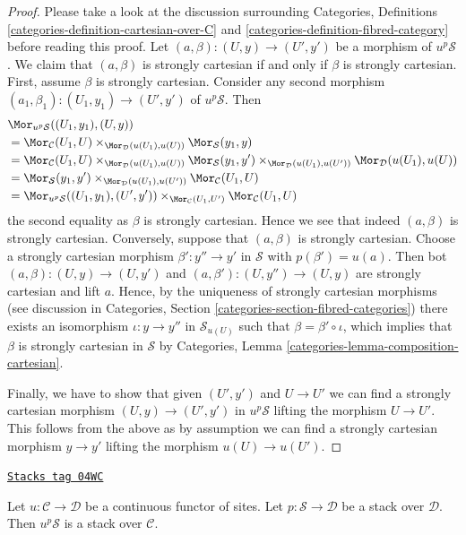 \begin{proof}
Please take a look at the discussion surrounding
Categories, Definitions \ref{categories-definition-cartesian-over-C} and
\ref{categories-definition-fibred-category}
before reading this proof.
Let $(a, \beta) : (U, y) \to (U', y')$ be a morphism of $u^p\mathcal{S}$.
We claim that $(a, \beta)$ is strongly cartesian if and only if
$\beta$ is strongly cartesian. First, assume $\beta$ is strongly cartesian.
Consider any second morphism
$(a_1, \beta_1) : (U_1, y_1) \to (U', y')$ of $u^p\mathcal{S}$.
Then
\begin{align*}
& \Mor_{u^p\mathcal{S}}((U_1, y_1), (U, y)) \\
& =
\Mor_\mathcal{C}(U_1, U)
\times_{\Mor_\mathcal{D}(u(U_1), u(U))}
\Mor_\mathcal{S}(y_1, y) \\
& =
\Mor_\mathcal{C}(U_1, U)
\times_{\Mor_\mathcal{D}(u(U_1), u(U))}
\Mor_\mathcal{S}(y_1, y')
\times_{\Mor_\mathcal{D}(u(U_1), u(U'))}
\Mor_\mathcal{D}(u(U_1), u(U)) \\
& =
\Mor_\mathcal{S}(y_1, y')
\times_{\Mor_\mathcal{D}(u(U_1), u(U'))}
\Mor_\mathcal{C}(U_1, U) \\
& =
\Mor_{u^p\mathcal{S}}((U_1, y_1), (U', y'))
\times_{\Mor_\mathcal{C}(U_1, U')}
\Mor_\mathcal{C}(U_1, U)
\end{align*}
the second equality as $\beta$ is strongly cartesian. Hence we see that
indeed $(a, \beta)$ is strongly cartesian. Conversely, suppose that
$(a, \beta)$ is strongly cartesian. Choose a strongly cartesian morphism
$\beta' : y'' \to y'$ in $\mathcal{S}$ with $p(\beta') = u(a)$.
Then bot $(a, \beta) : (U, y) \to (U, y')$ and
$(a, \beta') : (U, y'') \to (U, y)$ are strongly cartesian and
lift $a$. Hence, by the uniqueness of strongly cartesian morphisms
(see discussion in
Categories, Section \ref{categories-section-fibred-categories})
there exists an isomorphism $\iota : y \to y''$ in $\mathcal{S}_{u(U)}$
such that $\beta = \beta' \circ \iota$, which implies that
$\beta$ is strongly cartesian in $\mathcal{S}$ by
Categories, Lemma \ref{categories-lemma-composition-cartesian}.

\medskip\noindent
Finally, we have to show
that given $(U', y')$ and $U \to U'$ we can find a strongly
cartesian morphism $(U, y) \to (U', y')$ in $u^p\mathcal{S}$
lifting the morphism $U \to U'$. This follows from the above as by assumption
we can find a strongly cartesian morphism $y \to y'$ lifting the
morphism $u(U) \to u(U')$.
\end{proof}

\begin{lemma}
\label{stacks-lemma-stack-pushforward}
\href{https://stacks.math.columbia.edu/tag/04WC}{\texttt{Stacks tag 04WC}}

Let $u : \mathcal{C} \to \mathcal{D}$ be a continuous functor of sites.
Let $p : \mathcal{S} \to \mathcal{D}$ be a stack over $\mathcal{D}$.
Then $u^p\mathcal{S}$ is a stack over $\mathcal{C}$.
\end{lemma}

